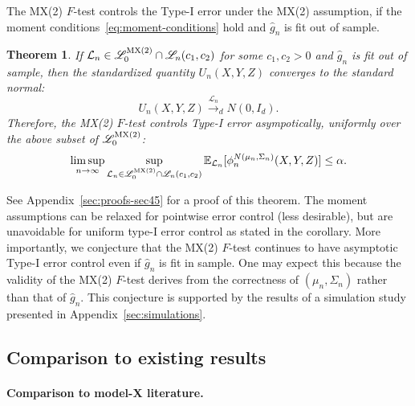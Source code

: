 \documentclass[ejs]{imsart}
\numberwithin{equation}{section}
\theoremstyle{plain}
\newtheorem{theorem}{Theorem}[section]
\theoremstyle{definition}
\theoremstyle{remark}
\newcommand{\srx}{X}
\newcommand{\srz}{Z}
\newcommand{\sry}{Y}
\begin{document}
The MX(2) $F$-test controls the Type-I error under the MX(2) assumption, if the moment conditions~\eqref{eq:moment-conditions} hold and $\widehat g_n$ is fit out of sample.
\begin{theorem} \label{thm:asymptotic-alpha-level}
If $\mathcal L_n \in \mathscr L_0^{\textnormal{MX(2)}}\cap \mathscr L_n(c_1, c_2)$ for some $c_1, c_2 > 0$ and $\widehat g_n$ is fit out of sample, then the standardized quantity $U_n(\srx, \sry, \srz)$ converges to the standard normal: 
\begin{equation}
	U_n(\srx, \sry, \srz) \overset{\mathcal L_n}\rightarrow_d N(0, I_d).
	\label{eq:asymptotic-normality}
\end{equation}
Therefore, the MX(2) $F$-test controls Type-I error asympotically, uniformly over the above subset of $\mathscr L_0^{\textnormal{MX(2)}}$: 
\begin{equation}
	\limsup_{n \rightarrow \infty} \sup_{\mathcal L_n \in \mathscr L_0^{\textnormal{MX(2)}}\cap \mathscr L_n(c_1, c_2)} \mathbb E_{\mathcal L_n}[\phi^{N(\mu_n, \Sigma_n)}_n(\srx, \sry, \srz)] \leq \alpha.
	\label{asymptotic-alpha-level}
\end{equation}
\end{theorem}

See Appendix~\ref{sec:proofs-sec45} for a proof of this theorem. The moment assumptions can be relaxed for pointwise error control (less desirable), but are unavoidable for uniform type-I error control as stated in the corollary. More importantly, we conjecture that the MX(2) $F$-test continues to have asymptotic Type-I error control even if $\widehat g_n$ is fit in sample. One may expect this because the validity of the MX(2) $F$-test derives from the correctness of $(\mu_n, \Sigma_n)$ rather than that of $\widehat g_n$. This conjecture is supported by the results of a simulation study presented in Appendix~\ref{sec:simulations}.

\subsection{Comparison to existing results} \label{sec:comparison-to-existing-results-3}

\paragraph{Comparison to model-X literature.}
\end{document}
